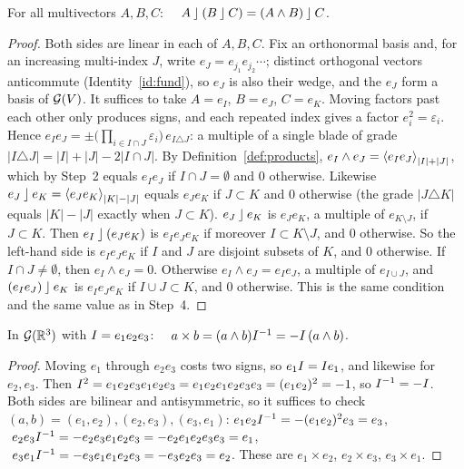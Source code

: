 \begin{identity}\label{id:contr3}
For all multivectors $A,B,C$: $\quad A\mathbin{\rfloor}(B\mathbin{\rfloor} C)=(A\wedge B)\mathbin{\rfloor} C$.
\end{identity}
\begin{proof}
 Both sides are linear in each of $A,B,C$. Fix an orthonormal basis and, for an increasing
multi-index $J$, write $e_J=e_{j_1}e_{j_2}\cdots$; distinct orthogonal vectors anticommute (Identity~\ref{id:fund}), so $e_J$ is
also their wedge, and the $e_J$ form a basis of $\mathcal{G}(V)$. It suffices to take $A=e_I$, $B=e_J$, $C=e_K$.
 Moving factors past each other only produces signs, and each repeated index gives a factor
$e_i^2=\varepsilon_i$. Hence $e_Ie_J=\pm\bigl(\textstyle\prod_{i\in I\cap J}\varepsilon_i\bigr)\,e_{I\triangle J}$: a multiple of a
single blade of grade $|I\triangle J|=|I|+|J|-2|I\cap J|$.
 By Definition~\ref{def:products}, $e_I\wedge e_J=\left\langle e_Ie_J \right\rangle_{|I|+|J|}$, which by Step~2
equals $e_Ie_J$ if $I\cap J=\emptyset$ and $0$ otherwise. Likewise $e_J\mathbin{\rfloor} e_K=\left\langle e_Je_K \right\rangle_{|K|-|J|}$ equals $e_Je_K$ if
$J\subset K$ and $0$ otherwise (the grade $|J\triangle K|$ equals $|K|-|J|$ exactly when $J\subset K$).
 $e_J\mathbin{\rfloor} e_K$ is $e_Je_K$, a multiple of $e_{K\setminus J}$, if $J\subset K$. Then $e_I\mathbin{\rfloor}(e_Je_K)$ is
$e_Ie_Je_K$ if moreover $I\subset K\setminus J$, and $0$ otherwise. So the left-hand side is $e_Ie_Je_K$ if $I$ and $J$ are
disjoint subsets of $K$, and $0$ otherwise.
 If $I\cap J\neq\emptyset$, then $e_I\wedge e_J=0$. Otherwise $e_I\wedge e_J=e_Ie_J$, a multiple of
$e_{I\cup J}$, and $(e_Ie_J)\mathbin{\rfloor} e_K$ is $e_Ie_Je_K$ if $I\cup J\subset K$, and $0$ otherwise. This is the same condition and the
same value as in Step~4.
\end{proof}

\begin{identity}\label{id:cross}
In $\mathcal{G}(\mathbb{R}^3)$ with $I=e_1e_2e_3$: $\quad a\times b=(a\wedge b)I^{-1}=-I\,(a\wedge b)$.
\end{identity}
\begin{proof}
 Moving $e_1$ through $e_2e_3$ costs two signs, so $e_1I=I e_1$, and likewise for
$e_2,e_3$. Then $I^2=e_1e_2e_3e_1e_2e_3=e_1e_2e_1e_2e_3e_3=(e_1e_2)^2=-1$, so $I^{-1}=-I$.
 Both sides are bilinear and antisymmetric, so it suffices to check $(a,b)=(e_1,e_2),(e_2,e_3),(e_3,e_1)$:
$e_1e_2I^{-1}=-(e_1e_2)^2e_3=e_3$, $\ e_2e_3\pss^{-1}=-e_2e_3e_1e_2e_3=-e_2e_1e_2e_3e_3=e_1$,
$\ e_3e_1\pss^{-1}=-e_3e_1e_1e_2e_3=-e_3e_2e_3=e_2$. These are $e_1\times e_2$, $e_2\times e_3$, $e_3\times e_1$.
\end{proof}

